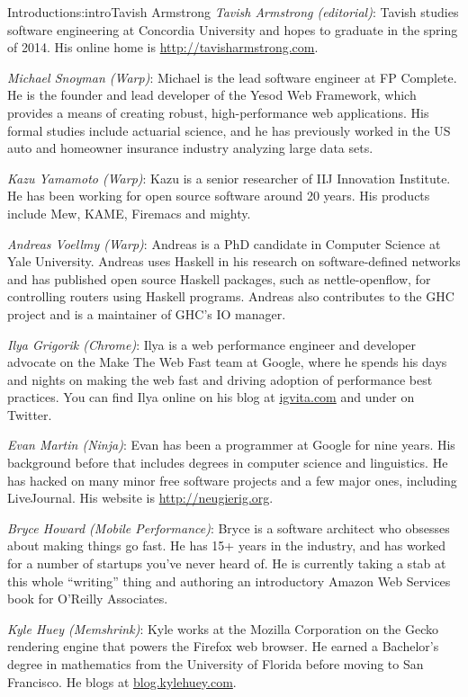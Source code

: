 \begin{aosachapter}{Introduction}{s:intro}{Tavish Armstrong}
\hspace{\parindent} \emph{Tavish Armstrong (editorial)}: Tavish studies software engineering at Concordia University and hopes to graduate in the spring of 2014. His online home is \url{http://tavisharmstrong.com}.

\emph{Michael Snoyman (Warp)}: Michael is the lead software engineer at FP Complete. He is the founder and lead developer of the Yesod Web Framework, which provides a means of creating robust, high-performance web applications. His formal studies include actuarial science, and he has previously worked in the US auto and homeowner insurance industry analyzing large data sets.

\emph{Kazu Yamamoto (Warp)}: Kazu is a senior researcher of IIJ Innovation Institute. He has been working for open source software around 20 years. His products include Mew, KAME, Firemacs and mighty.

\emph{Andreas Voellmy (Warp)}: Andreas is a PhD candidate in Computer Science at Yale University. Andreas uses Haskell in his research on software-defined networks and has published open source Haskell packages, such as nettle-openflow, for controlling routers using Haskell programs. Andreas also contributes to the GHC project and is a maintainer of GHC's IO manager.

\emph{Ilya Grigorik (Chrome)}: Ilya is a web performance engineer and developer advocate on the Make The Web Fast team at Google, where he spends his days and nights on making the web fast and driving adoption of performance best practices. You can find Ilya online on his blog at \url{igvita.com} and under  on Twitter.  

\emph{Evan Martin (Ninja)}:
Evan has been a programmer at Google for nine years.  His background before that includes degrees in computer science and linguistics.  He has hacked on many minor free software projects and a few major ones, including LiveJournal.  His website is \url{http://neugierig.org}.

\emph{Bryce Howard (Mobile Performance)}: 
Bryce is a software architect who obsesses about making things go fast. He has 15+ years in the industry, and has worked for a number of startups you've never heard of. He is currently taking a stab at this whole ``writing'' thing and authoring an introductory Amazon Web Services book for O'Reilly Associates.

\emph{Kyle Huey (Memshrink)}:
Kyle works at the Mozilla Corporation on the Gecko rendering engine
that powers the Firefox web browser.  He earned a Bachelor's degree in
mathematics from the University of Florida before moving to San Francisco.
He blogs at \url{blog.kylehuey.com}.


\end{aosachapter}
